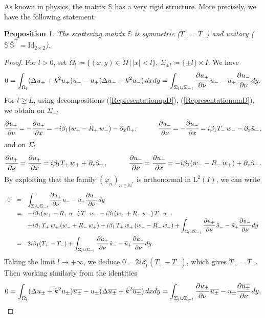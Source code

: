 \documentclass[11pt,a4paper]{report}
\newcommand{\dsp}{\displaystyle}
\newcommand{\Om}{\Omega}
\newcommand{\mrm}[1]{\mathrm{#1}}
\newcommand{\N}{\mathbb{N}}
\newcommand{\mL}{\mrm{L}}
\newtheorem{proposition}[theorem]{Proposition}
\begin{document}
As known in physics, the matrix $\mathbb{S}$ has a very rigid structure. More precisely, we have the following statement:
\begin{proposition}\label{PropoStructureS}
The scattering matrix $\mathbb{S}$ is symmetric ($T_+=T_-$) and unitary ($\mathbb{S}\,\overline{\mathbb{S}}^{\top}=\mrm{Id}_{2\times2}$).
\end{proposition}
\begin{proof}
For $l>0$, set $\Om_{l}\coloneqq\{(x,y)\in\Om\,|\,|x|<l\}$, $\Sigma_{\pm l}\coloneqq\{\pm l\}\times I$. We have
\[
0=\int_{\Om_{l}} (\Delta u_++k^2u_+)u_--u_+(\Delta u_-+k^2u_-)\,dxdy=\int_{\Sigma_{l}\cup\Sigma_{-l}}\cfrac{\partial u_+}{\partial \nu}\,u_--u_+\cfrac{\partial u_-}{\partial \nu}\,dy.
\]
For $l\ge L$, using decompositions (\ref{RepresentationupD}), (\ref{RepresentationumD}), we obtain on $\Sigma_{-l}$ 
\[
\cfrac{\partial u_+}{\partial \nu}=-\cfrac{\partial u_+}{\partial x}= -i\beta_1 (w_+-R_+\,w_-)-\partial_x\tilde{u}_+,\qquad\quad \cfrac{\partial u_-}{\partial \nu}=-\cfrac{\partial u_-}{\partial x}= i\beta_1 T_- \,w_--\partial_x\tilde{u}_-,
\]
and on $\Sigma_{l}$ 
\[
\cfrac{\partial u_+}{\partial \nu}=\cfrac{\partial u_+}{\partial x}= i\beta_1 T_+ \,w_++\partial_x\tilde{u}_+,\qquad\quad \cfrac{\partial u_-}{\partial \nu}=\cfrac{\partial u_-}{\partial x}= -i\beta_1 (w_--R_-\,w_+)+\partial_x\tilde{u}_-.
\]
By exploiting that the family $(\varphi_n)_{n\in\N^\ast}$ is orthonormal in $\mL^2(I)$, we can write 
\[
\begin{array}{rcl}
0&=&\dsp\int_{\Sigma_{l}\cup\Sigma_{-l}}\cfrac{\partial u_+}{\partial \nu}\,u_--u_+\cfrac{\partial u_-}{\partial \nu}\,dy \\[10pt]
&=& -i\beta_1 (w_+-R_+\,w_-)\,T_-\,w_--i\beta_1(w_++R_+\,w_-)\,T_-\,w_- \\
 & &+i\beta_1\,T_+\,w_+\, (w_-+R_-\,w_+)+i\beta_1\,T_+\,w_+\, (w_--R_-\,w_+) +\dsp\int_{\Sigma_{l}\cup\Sigma_{-l}}\cfrac{\partial \tilde{u}_+}{\partial \nu}\,\tilde{u}_--\tilde{u}_+\cfrac{\partial \tilde{u}_-}{\partial \nu}\,dy\\[10pt]
& = & 2i\beta_1(T_+-T_-)+\dsp\int_{\Sigma_{l}\cup\Sigma_{-l}}\cfrac{\partial \tilde{u}_+}{\partial \nu}\,\tilde{u}_--\tilde{u}_+\cfrac{\partial \tilde{u}_-}{\partial \nu}\,dy.
\end{array}
\]
Taking the limit $l\to+\infty$, we deduce $0=2i\beta_1(T_+-T_-)$, which gives $T_+=T_-$. Then working similarly from the identities
\[
0=\int_{\Om_{l}} (\Delta u_\pm+k^2u_\pm)\overline{u_\pm}-u_\pm(\Delta \overline{u_\pm}+k^2\overline{u_\pm})\,dxdy=\int_{\Sigma_{l}\cup\Sigma_{-l}}\cfrac{\partial u_\pm}{\partial \nu}\,\overline{u_\pm}-u_\pm\cfrac{\partial \overline{u_\pm}}{\partial \nu}\,dy,
\]
\end{proof}
\end{document}
